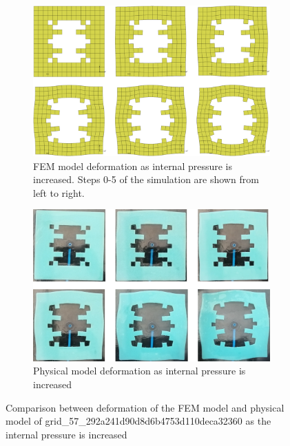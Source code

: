 \begin{figure}[H]
	\centering
	\begin{subfigure}[c]{\textwidth}
		\centering
		\includegraphics[width=\textwidth]{unit2deffem.png}
		\caption{FEM model deformation as internal pressure is increased. Steps 0-5 of the simulation are shown from left to right.}
	\end{subfigure}
	\hfill
	\begin{subfigure}[c]{\textwidth}
		\centering
		\includegraphics[width=\textwidth]{unit2defmod.png}
		\caption{Physical model deformation as internal pressure is increased}
	\end{subfigure}
	\caption[Comparison between FEM and physical models of unit 2]{Comparison between deformation of the FEM model and physical model of grid\_57\_292a241d90d8d6b4753d110deca32360 as the internal pressure is increased}
	\label{fig:unit2def}
\end{figure}


